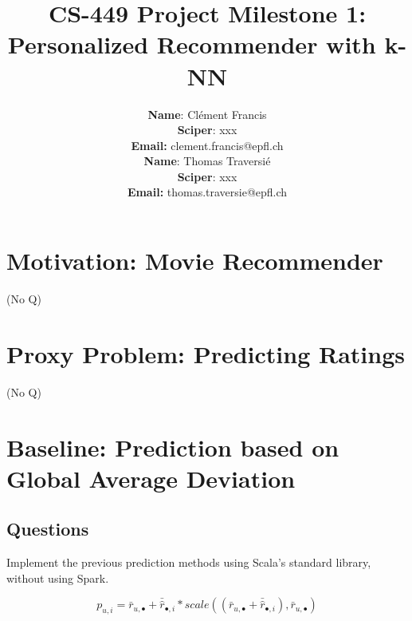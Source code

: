 \documentclass{article}
\title{CS-449 Project Milestone 1: Personalized Recommender with k-NN}
\author{
\textbf{Name}: Clément Francis\\
\textbf{Sciper}: xxx\\
\textbf{Email:} clement.francis@epfl.ch\\
\textbf{Name}: Thomas Traversié\\
\textbf{Sciper}: xxx\\
\textbf{Email:} thomas.traversie@epfl.ch\\
}
\begin{document}
\maketitle

\section{Motivation: Movie Recommender}
(No Q)
\section{Proxy Problem: Predicting Ratings}
(No Q)

\section{Baseline: Prediction based on Global Average Deviation}
\subsection{Questions}
\label{section:q1}

Implement the previous prediction methods using Scala's standard library, without using Spark.

\begin{equation}
    \label{eq:baseline}
    p_{u,i} = \bar r_{u,\bullet} + \bar{\hat r}_{\bullet,i} * scale( (\bar r_{u,\bullet} + \bar{\hat r}_{\bullet,i}), \bar r_{u,\bullet})
\end{equation}
  
\end{document}
